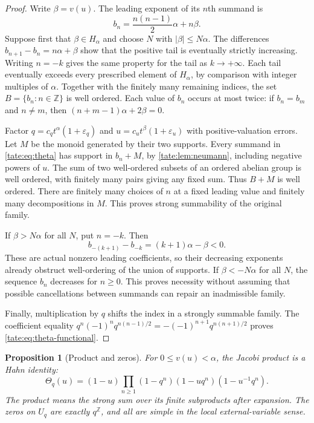\documentclass[11pt,letterpaper]{article}
\newtheorem{proposition}[proposition]{Proposition}
\theoremstyle{definition}
\newcommand{\Z}{\mathbb Z}
\begin{document}
\begin{proof}
Write $\beta=v(u)$. The leading exponent of its $n$th summand is
\begin{equation}
 b_n=\frac{n(n-1)}2\alpha+n\beta.\label{tate:eq:bn}
\end{equation}
Suppose first that $\beta\in H_\alpha$ and choose $N$ with
$|\beta|\le N\alpha$. The differences
$b_{n+1}-b_n=n\alpha+\beta$ show that the positive tail is eventually
strictly increasing. Writing $n=-k$ gives the same property for the tail
as $k\to+\infty$. Each tail eventually exceeds every prescribed element
of $H_\alpha$, by comparison with integer multiples of $\alpha$.
Together with the finitely many remaining indices, the set
$B=\{b_n:n\in\Z\}$ is well ordered. Each value of $b_n$ occurs at most
twice: if $b_n=b_m$ and $n\ne m$, then
$(n+m-1)\alpha+2\beta=0$.

Factor
$q=c_qt^\alpha(1+\varepsilon_q)$ and
$u=c_ut^\beta(1+\varepsilon_u)$ with positive-valuation errors.
Let $M$ be the monoid generated by their two supports. Every summand in
\eqref{tate:eq:theta} has support in $b_n+M$, by \cref{tate:lem:neumann}, including
negative powers of $u$. The sum of two well-ordered subsets of an ordered
abelian group is well ordered, with finitely many pairs giving any fixed
sum. Thus $B+M$ is well ordered. There are finitely many choices of $n$
at a fixed leading value and finitely many decompositions in $M$.
This proves strong summability of the original family.

If $\beta>N\alpha$ for all $N$, put $n=-k$. Then
\[
 b_{-(k+1)}-b_{-k}=(k+1)\alpha-\beta<0.
\]
These are actual nonzero leading coefficients, so their decreasing
exponents already obstruct well-ordering of the union of supports.
If $\beta<-N\alpha$ for all $N$, the sequence $b_n$ decreases for
$n\ge0$. This proves necessity without assuming that possible
cancellations between summands can repair an inadmissible family.

Finally, multiplication by $q$ shifts the index in a strongly summable
family. The coefficient equality
$q^n(-1)^nq^{n(n-1)/2}=-(-1)^{n+1}q^{n(n+1)/2}$ proves
\eqref{tate:eq:theta-functional}.
\end{proof}

\begin{proposition}[Product and zeros]\label{tate:prop:theta-product}
For $0\le v(u)<\alpha$, the Jacobi product is a Hahn identity:
\begin{equation}
 \Theta_q(u)=(1-u)\prod_{n\ge1}
          (1-q^n)(1-uq^n)(1-u^{-1}q^n).\label{tate:eq:triple}
\end{equation}
The product means the strong sum over its finite subproducts after
expansion. The zeros on $U_q$ are exactly $q^\Z$, and all are simple
in the local external-variable sense.
\end{proposition}
\end{document}
